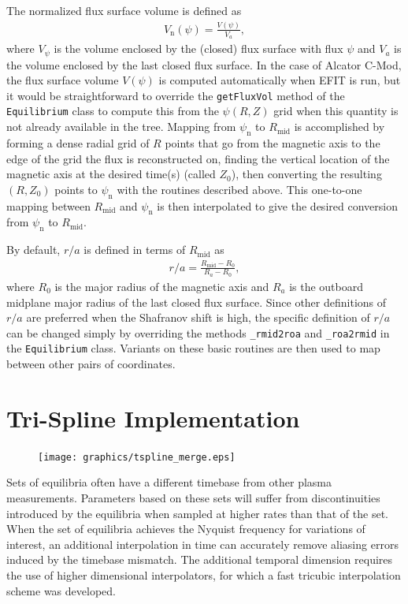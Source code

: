 \documentclass[12pt,floatfix,showpacs]{revtex4-1}
\begin{document}
The normalized flux surface volume is defined as
\begin{gather}
	V_{\text{n}}(\psi) = \frac{V(\psi)}{V_{a}},
\end{gather}
where $V_{\psi}$ is the volume enclosed by the (closed) flux surface with flux $\psi$ and $V_{a}$ is the volume enclosed by the last closed flux surface.
In the case of Alcator C-Mod, the flux surface volume $V(\psi)$ is computed automatically when EFIT is run, but it would be straightforward to override the \verb|getFluxVol| method of the \verb|Equilibrium| class to compute this from the $\psi(R, Z)$ grid when this quantity is not already available in the tree.
Mapping from $\psi_{\text{n}}$ to $R_{\text{mid}}$ is accomplished by forming a dense radial grid of $R$ points that go from the magnetic axis to the edge of the grid the flux is reconstructed on, finding the vertical location of the magnetic axis at the desired time(s) (called $Z_{0}$), then converting the resulting $(R, Z_{0})$ points to $\psi_{\text{n}}$ with the routines described above.
This one-to-one mapping between $R_{\text{mid}}$ and $\psi_{\text{n}}$ is then interpolated to give the desired conversion from $\psi_{\text{n}}$ to $R_{\text{mid}}$.

By default, $r/a$ is defined in terms of $R_{\text{mid}}$ as
\begin{gather}
	r/a = \frac{R_{\text{mid}} - R_{0}}{R_{a} - R_{0}},
\end{gather}
where $R_{0}$ is the major radius of the magnetic axis and $R_{a}$ is the outboard midplane major radius of the last closed flux surface.
Since other definitions of $r/a$ are preferred when the Shafranov shift is high, the specific definition of $r/a$ can be changed simply by overriding the methods \verb|_rmid2roa| and \verb|_roa2rmid| in the \verb|Equilibrium| class.
Variants on these basic routines are then used to map between other pairs of coordinates.

\section{Tri-Spline Implementation}\label{sec:trispline}

\begin{figure}[ht]
 \texttt{[image: graphics/tspline\_merge.eps]}
 \caption{}
 \label{fig:tspline}
\end{figure}

Sets of equilibria often have a different timebase from other plasma measurements. Parameters based on these sets will suffer from discontinuities introduced by the equilibria when sampled at higher rates than that of the set.  When the set of equilibria achieves the Nyquist frequency for variations of interest, an additional interpolation in time can accurately remove aliasing errors induced by the timebase mismatch. The additional temporal dimension requires the use of higher dimensional interpolators, for which a fast tricubic interpolation scheme was developed. 
\end{document}
